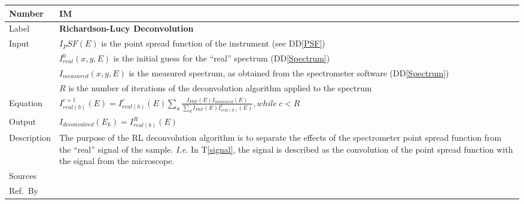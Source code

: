 \documentclass[12pt]{article}
\newcommand{\colAwidth}{0.13\textwidth}
\newcommand{\colBwidth}{0.82\textwidth}
\newcommand{\ddref}[1]{DD\ref{#1}}
\newcommand{\tref}[1]{T\ref{#1}}
\newcounter{instnum} %
\begin{document}
\noindent
\begin{minipage}{\textwidth}
	\renewcommand*{\arraystretch}{1.5}
	\begin{tabular}{| p{\colAwidth} | p{\colBwidth}|}
		\hline
		\rowcolor[gray]{0.9}
		Number & IM{instnum}\theinstnum \label{deconvolution}\\
		\hline
		Label & \bf Richardson-Lucy Deconvolution\\
		\hline
		Input& $I_PSF(E)$ is the point spread function of the instrument (see \ddref{PSF})\\
		& $I_{real}^0(x,y,E)$ is the initial guess for the ``real'' spectrum (\ddref{Spectrum})\\
		& $I_{measured}(x,y,E)$ is the measured spectrum, as obtained from the spectrometer software (\ddref{Spectrum})\\
		& $R$ is the number of iterations of the deconvolution algorithm applied to the spectrum \\
		\hline
		Equation & $I_{real (b)}^{c+1}(E)=I_{real (b)}^c(E)\sum_a{\frac{I_{PSF}(E)I_{measured}(E)}{\sum_d{I_{PSF}(E)I_{real (d)}^c(E)}}}, while\ c < R$\\
		\hline
		Output& $I_{deconvolved}(E_k)=I_{real (b)}^{R}(E)$\\
		\hline
		Description & The purpose of the RL deconvolution algorithm is to separate the effects of the spectrometer point spread function from the ``real'' signal of the sample. \textit{I.e.} In \tref{signal}, the signal is described as the convolution of the point spread function with the signal from the microscope.\\
		\hline
		Sources&~\cite{gloter_improving_2003, bellido_toward_2014} \ \\
		\hline
		Ref.\ By & \\
		\hline
	\end{tabular}
\end{minipage}\\

~\newline

\end{document}
